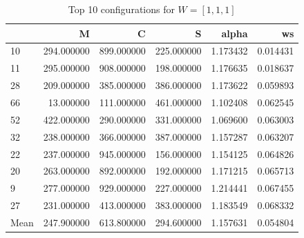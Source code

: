 \begin{frame}
    \begin{table}
        \caption{Top 10 configurations for \(W=[1,1,1]\)}
    \begin{tabular}{lrrrrr}
    \toprule
     & M & C & S & alpha & ws \\
    \midrule
    10 & 294.000000 & 899.000000 & 225.000000 & 1.173432 & 0.014431 \\
    11 & 295.000000 & 908.000000 & 198.000000 & 1.176635 & 0.018637 \\
    28 & 209.000000 & 385.000000 & 386.000000 & 1.173622 & 0.059893 \\
    66 & 13.000000 & 111.000000 & 461.000000 & 1.102408 & 0.062545 \\
    52 & 422.000000 & 290.000000 & 331.000000 & 1.069600 & 0.063003 \\
    32 & 238.000000 & 366.000000 & 387.000000 & 1.157287 & 0.063207 \\
    22 & 237.000000 & 945.000000 & 156.000000 & 1.154125 & 0.064826 \\
    20 & 263.000000 & 892.000000 & 192.000000 & 1.171215 & 0.065713 \\
    9 & 277.000000 & 929.000000 & 227.000000 & 1.214441 & 0.067455 \\
    27 & 231.000000 & 413.000000 & 383.000000 & 1.183549 & 0.068332 \\
    \midrule
    Mean & 247.900000 & 613.800000 & 294.600000 & 1.157631 & 0.054804 \\
    \bottomrule
    \end{tabular}
    \end{table}
\end{frame}

